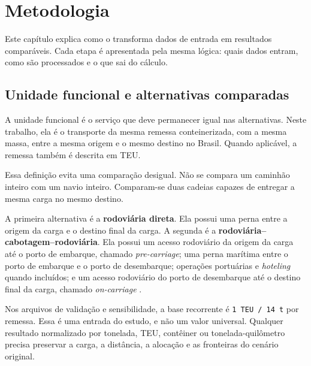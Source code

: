 \chapter{Metodologia}
\label{ch:metodologia}

Este capítulo explica como o \CabotageLens{} transforma dados de entrada em resultados comparáveis. Cada etapa é apresentada pela mesma lógica: quais dados entram, como são processados e o que sai do cálculo.

\section{Unidade funcional e alternativas comparadas}
\label{sec:unidade-funcional}

A unidade funcional é o serviço que deve permanecer igual nas alternativas. Neste trabalho, ela é o transporte da mesma remessa conteinerizada, com a mesma massa, entre a mesma origem e o mesmo destino no Brasil. Quando aplicável, a remessa também é descrita em TEU.

Essa definição evita uma comparação desigual. Não se compara um caminhão inteiro com um navio inteiro. Comparam-se duas cadeias capazes de entregar a mesma carga no mesmo destino.

A primeira alternativa é a \textbf{rodoviária direta}. Ela possui uma perna entre a origem da carga e o destino final da carga. A segunda é a \textbf{rodoviária--cabotagem--rodoviária}. Ela possui um acesso rodoviário da origem da carga até o porto de embarque, chamado \emph{pre-carriage}; uma perna marítima entre o porto de embarque e o porto de desembarque; operações portuárias e \emph{hoteling} quando incluídos; e um acesso rodoviário do porto de desembarque até o destino final da carga, chamado \emph{on-carriage} \cite{shortsea2019,competitiveness2024,modalshiftreview2020}.

Nos arquivos de validação e sensibilidade, a base recorrente é \texttt{1 TEU / 14 t} por remessa. Essa é uma entrada do estudo, e não um valor universal. Qualquer resultado normalizado por tonelada, TEU, contêiner ou tonelada-quilômetro precisa preservar a carga, a distância, a alocação e as fronteiras do cenário original.

